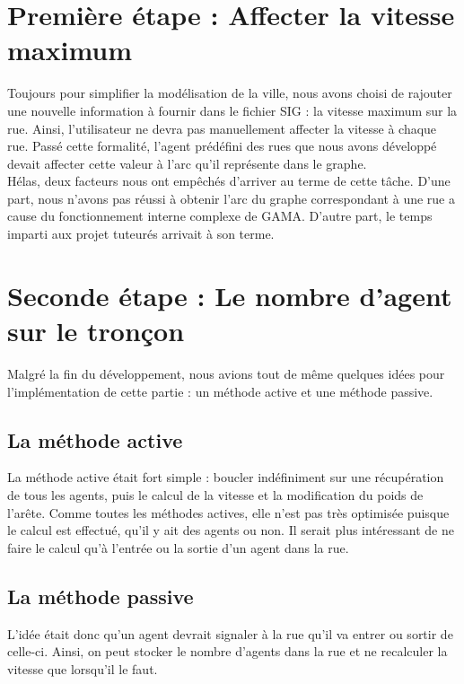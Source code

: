 \documentclass[11pt]{report} %
\begin{document}
\section{Premi\`ere \'etape : Affecter la vitesse maximum}
Toujours pour simplifier la mod\'elisation de la ville, nous avons choisi de rajouter une nouvelle information \`a fournir dans le fichier SIG : la vitesse maximum sur la rue. Ainsi, l'utilisateur ne devra pas manuellement affecter la vitesse \`a chaque rue. Pass\'e cette formalit\'e, l'agent pr\'ed\'efini des rues que nous avons d\'evelopp\'e devait affecter cette valeur \`a l'arc qu'il repr\'esente dans le graphe.\\
H\'elas, deux facteurs nous ont emp\^ech\'es d'arriver au terme de cette tâche. D'une part,  nous n'avons pas r\'eussi \`a obtenir l'arc du graphe correspondant \`a une rue a cause du fonctionnement interne complexe de GAMA. D'autre part, le temps imparti aux projet tuteur\'es arrivait \`a son terme.

\section{Seconde \'etape : Le nombre d'agent sur le tronçon}
Malgr\'e la fin du d\'eveloppement, nous avions tout de m\^eme quelques id\'ees pour l'impl\'ementation de cette partie : un m\'ethode active et une m\'ethode passive.

\subsection{La m\'ethode active}
La m\'ethode active \'etait fort simple : boucler ind\'efiniment sur une r\'ecup\'eration de tous les agents, puis le calcul de la vitesse et la modification du poids de l'ar\^ete. Comme toutes les m\'ethodes actives, elle n'est pas tr\`es optimis\'ee puisque le calcul est effectu\'e, qu'il y ait des agents ou non. Il serait plus int\'eressant de ne faire le calcul qu'\`a l'entr\'ee ou la sortie d'un agent dans la rue.

\subsection{La m\'ethode passive}
L'id\'ee \'etait donc qu'un agent devrait signaler \`a la rue qu'il va entrer ou sortir de celle-ci. Ainsi, on peut stocker le nombre d'agents dans la rue et ne recalculer la vitesse que lorsqu'il le faut.
\end{document}
